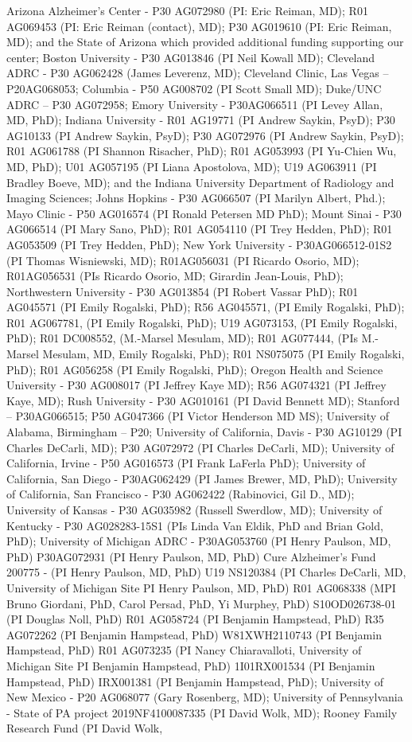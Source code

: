 \documentclass[pdflatex,sn-nature]{sn-jnl}%
\theoremstyle{thmstyleone}%
\theoremstyle{thmstyletwo}%
\theoremstyle{thmstylethree}%
\begin{document}
\begin{appendices}
Arizona Alzheimer’s Center - P30 AG072980 (PI: Eric Reiman, MD); R01 AG069453 (PI: Eric Reiman (contact), MD); P30 AG019610 (PI: Eric Reiman, MD); and the State of Arizona which provided additional funding supporting our center; Boston University - P30 AG013846 (PI Neil Kowall MD); Cleveland ADRC - P30 AG062428 (James Leverenz, MD); Cleveland Clinic, Las Vegas – P20AG068053; Columbia - P50 AG008702 (PI Scott Small MD); Duke/UNC ADRC – P30 AG072958; Emory University - P30AG066511 (PI Levey Allan, MD, PhD); Indiana University - R01 AG19771 (PI Andrew Saykin, PsyD); P30 AG10133 (PI Andrew Saykin, PsyD); P30 AG072976 (PI Andrew Saykin, PsyD); R01 AG061788 (PI Shannon Risacher, PhD); R01 AG053993 (PI Yu-Chien Wu, MD, PhD); U01 AG057195 (PI Liana Apostolova, MD); U19 AG063911 (PI Bradley Boeve, MD); and the Indiana University Department of Radiology and Imaging Sciences; Johns Hopkins - P30 AG066507 (PI Marilyn Albert, Phd.); Mayo Clinic - P50 AG016574 (PI Ronald Petersen MD PhD); Mount Sinai - P30 AG066514 (PI Mary Sano, PhD); R01 AG054110 (PI Trey Hedden, PhD); R01 AG053509 (PI Trey Hedden, PhD); New York University - P30AG066512-01S2 (PI Thomas Wisniewski, MD); R01AG056031 (PI Ricardo Osorio, MD); R01AG056531 (PIs Ricardo Osorio, MD; Girardin Jean-Louis, PhD); Northwestern University - P30 AG013854 (PI Robert Vassar PhD); R01 AG045571 (PI Emily Rogalski, PhD); R56 AG045571, (PI Emily Rogalski, PhD); R01 AG067781, (PI Emily Rogalski, PhD); U19 AG073153, (PI Emily Rogalski, PhD); R01 DC008552, (M.-Marsel Mesulam, MD); R01 AG077444, (PIs M.-Marsel Mesulam, MD, Emily Rogalski, PhD); R01 NS075075 (PI Emily Rogalski, PhD); R01 AG056258 (PI Emily Rogalski, PhD); Oregon Health and Science University - P30 AG008017 (PI Jeffrey Kaye MD); R56 AG074321 (PI Jeffrey Kaye, MD); Rush University - P30 AG010161 (PI David Bennett MD); Stanford – P30AG066515; P50 AG047366 (PI Victor Henderson MD MS); University of Alabama, Birmingham – P20; University of California, Davis - P30 AG10129 (PI Charles DeCarli, MD); P30 AG072972 (PI Charles DeCarli, MD); University of California, Irvine - P50 AG016573 (PI Frank LaFerla PhD); University of California, San Diego - P30AG062429 (PI James Brewer, MD, PhD); University of California, San Francisco - P30 AG062422 (Rabinovici, Gil D., MD); University of Kansas - P30 AG035982 (Russell Swerdlow, MD); University of Kentucky - P30 AG028283-15S1 (PIs Linda Van Eldik, PhD and Brian Gold, PhD); University of Michigan ADRC - P30AG053760 (PI Henry Paulson, MD, PhD) P30AG072931 (PI Henry Paulson, MD, PhD) Cure Alzheimer's Fund 200775 - (PI Henry Paulson, MD, PhD) U19 NS120384 (PI Charles DeCarli, MD, University of Michigan Site PI Henry Paulson, MD, PhD) R01 AG068338 (MPI Bruno Giordani, PhD, Carol Persad, PhD, Yi Murphey, PhD) S10OD026738-01 (PI Douglas Noll, PhD) R01 AG058724 (PI Benjamin Hampstead, PhD) R35 AG072262 (PI Benjamin Hampstead, PhD) W81XWH2110743 (PI Benjamin Hampstead, PhD) R01 AG073235 (PI Nancy Chiaravalloti, University of Michigan Site PI Benjamin Hampstead, PhD) 1I01RX001534 (PI Benjamin Hampstead, PhD) IRX001381 (PI Benjamin Hampstead, PhD); University of New Mexico - P20 AG068077 (Gary Rosenberg, MD); University of Pennsylvania - State of PA project 2019NF4100087335 (PI David Wolk, MD); Rooney Family Research Fund (PI David Wolk, 
\end{appendices}
\end{document}
